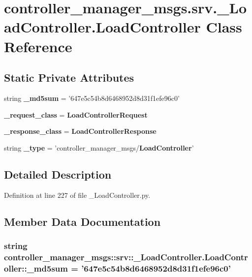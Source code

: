 \section{controller\-\_\-manager\-\_\-msgs.\-srv.\-\_\-\-Load\-Controller.\-Load\-Controller \-Class \-Reference}
\label{classcontroller__manager__msgs_1_1srv_1_1__LoadController_1_1LoadController}
\subsection*{\-Static \-Private \-Attributes}
\begin{DoxyCompactItemize}
\item 
string {\bf \-\_\-md5sum} = '647e5c54b8d6468952d8d31f1efe96c0'
\item 
{\bf \-\_\-request\-\_\-class} = {\bf \-Load\-Controller\-Request}
\item 
{\bf \-\_\-response\-\_\-class} = {\bf \-Load\-Controller\-Response}
\item 
string {\bf \-\_\-type} = 'controller\-\_\-manager\-\_\-msgs/{\bf \-Load\-Controller}'
\end{DoxyCompactItemize}


\subsection{\-Detailed \-Description}


\-Definition at line 227 of file \-\_\-\-Load\-Controller.\-py.



\subsection{\-Member \-Data \-Documentation}
\subsubsection[{\-\_\-md5sum}]{\setlength{\rightskip}{0pt plus 5cm}string {\bf controller\-\_\-manager\-\_\-msgs\-::srv\-::\-\_\-\-Load\-Controller.\-Load\-Controller\-::\-\_\-md5sum} = '647e5c54b8d6468952d8d31f1efe96c0'\hspace{0.3cm}{\ttfamily  [static, private]}}\label{classcontroller__manager__msgs_1_1srv_1_1__LoadController_1_1LoadController_ad75a934b923fac1464b77ac52e8a793e}


